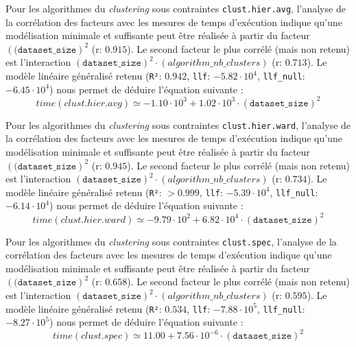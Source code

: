 			Pour les algorithmes du \textit{clustering} sous contraintes \texttt{clust.hier.avg}, l'analyse de la corrélation des facteurs avec les mesures de temps d'exécution indique qu'une modélisation minimale et suffisante peut être réalisée à partir du facteur $(\texttt{(dataset\_size})^{2}$ (r: $0.915$).
			Le second facteur le plus corrélé (mais non retenu) est l'interaction $(\texttt{dataset\_size})^{2}\cdot(algorithm\_nb\_clusters)$ (r: $0.713$).
			Le modèle linéaire généralisé retenu (\texttt{R²}: $0.942$, \texttt{llf}: $-5.82\cdot10^{4}$, \texttt{llf\_null}: $-6.45\cdot10^{4}$) nous permet de déduire l'équation suivante :
			\begin{equation}
				time(clust.hier.avg)
				\simeq -1.10\cdot10^{3} + 1.02\cdot10^{3}\cdot(\texttt{dataset\_size})^{2}
			\end{equation}

			Pour les algorithmes du \textit{clustering} sous contraintes \texttt{clust.hier.ward}, l'analyse de la corrélation des facteurs avec les mesures de temps d'exécution indique qu'une modélisation minimale et suffisante peut être réalisée à partir du facteur $(\texttt{(dataset\_size})^{2}$ (r: $0.945$).
			Le second facteur le plus corrélé (mais non retenu) est l'interaction $(\texttt{dataset\_size})^{2}\cdot(algorithm\_nb\_clusters)$ (r: $0.734$).
			Le modèle linéaire généralisé retenu (\texttt{R²}: $> 0.999$, \texttt{llf}: $-5.39\cdot10^{4}$, \texttt{llf\_null}: $-6.14\cdot10^{4}$) nous permet de déduire l'équation suivante :
			\begin{equation}
				time(clust.hier.ward)
				\simeq -9.79\cdot10^{2} + 6.82\cdot10^{4}\cdot(\texttt{dataset\_size})^{2}
			\end{equation}
			
			Pour les algorithmes du \textit{clustering} sous contraintes \texttt{clust.spec}, l'analyse de la corrélation des facteurs avec les mesures de temps d'exécution indique qu'une modélisation minimale et suffisante peut être réalisée à partir du facteur $(\texttt{(dataset\_size})^{2}$ (r: $0.658$).
			Le second facteur le plus corrélé (mais non retenu) est l'interaction $(\texttt{dataset\_size})^{2}\cdot(algorithm\_nb\_clusters)$ (r: $0.595$).
			Le modèle linéaire généralisé retenu (\texttt{R²}: $0.534$, \texttt{llf}: $-7.88\cdot10^{5}$, \texttt{llf\_null}: $-8.27\cdot10^{5}$) nous permet de déduire l'équation suivante :
			\begin{equation}
				time(clust.spec)
				\simeq 11.00 + 7.56\cdot10^{-6}\cdot(\texttt{dataset\_size})^{2}
			\end{equation}
			
